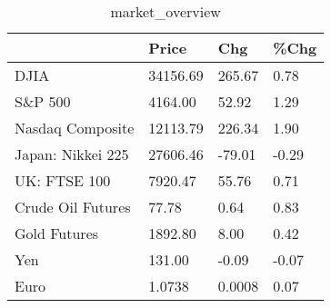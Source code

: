 \documentclass{article}%
\begin{document}
%


\begin{table}[htbp]%
\caption{market\_overview}%
\centering%
\begin{adjustbox}{width=1\textwidth}%
\begin{tabular}{llll}
\toprule
                  &    Price &    Chg &  \%Chg \\
\midrule
             DJIA & 34156.69 & 265.67 &  0.78 \\
          S\&P 500 &  4164.00 &  52.92 &  1.29 \\
 Nasdaq Composite & 12113.79 & 226.34 &  1.90 \\
Japan: Nikkei 225 & 27606.46 & -79.01 & -0.29 \\
     UK: FTSE 100 &  7920.47 &  55.76 &  0.71 \\
Crude Oil Futures &    77.78 &   0.64 &  0.83 \\
     Gold Futures &  1892.80 &   8.00 &  0.42 \\
              Yen &   131.00 &  -0.09 & -0.07 \\
             Euro &   1.0738 & 0.0008 &  0.07 \\
\bottomrule
\end{tabular}
%
\end{adjustbox}%
\end{table}

%
\end{document}
